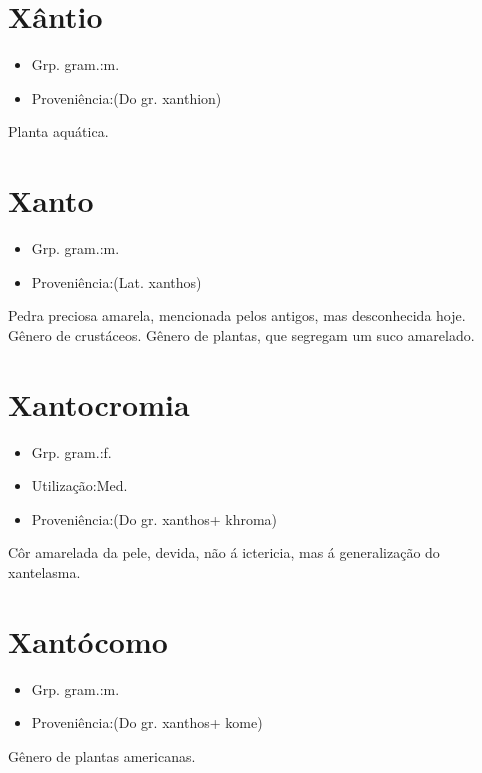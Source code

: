 \section{Xântio}
\begin{itemize}
\item {Grp. gram.:m.}
\end{itemize}
\begin{itemize}
\item {Proveniência:(Do gr. \textunderscore xanthion\textunderscore )}
\end{itemize}
Planta aquática.
\section{Xanto}
\begin{itemize}
\item {Grp. gram.:m.}
\end{itemize}
\begin{itemize}
\item {Proveniência:(Lat. \textunderscore xanthos\textunderscore )}
\end{itemize}
Pedra preciosa amarela, mencionada pelos antigos, mas desconhecida hoje.
Gênero de crustáceos.
Gênero de plantas, que segregam um suco amarelado.
\section{Xantocromia}
\begin{itemize}
\item {Grp. gram.:f.}
\end{itemize}
\begin{itemize}
\item {Utilização:Med.}
\end{itemize}
\begin{itemize}
\item {Proveniência:(Do gr. \textunderscore xanthos\textunderscore  + \textunderscore khroma\textunderscore )}
\end{itemize}
Côr amarelada da pele, devida, não á ictericia, mas á generalização do xantelasma.
\section{Xantócomo}
\begin{itemize}
\item {Grp. gram.:m.}
\end{itemize}
\begin{itemize}
\item {Proveniência:(Do gr. \textunderscore xanthos\textunderscore  + \textunderscore kome\textunderscore )}
\end{itemize}
Gênero de plantas americanas.
